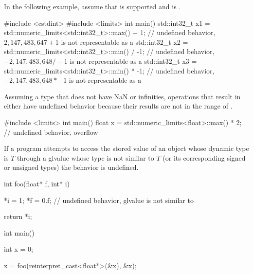 \pnum
\begin{example}
In the following example, assume that
 is supported
and is .
\begin{codeblock}
#include <cstdint>
#include <limits>
int main() {
  std::int32_t x1 = std::numeric_limits<std::int32_t>::max() + 1;
        // undefined behavior, $2{,}147{,}483{,}647 + 1$ is not representable as a 
  std::int32_t x2 = std::numeric_limits<std::int32_t>::min() / -1;
        // undefined behavior, $-2{,}147{,}483{,}648 / -1$ is not representable as a 
  std::int32_t x3 = std::numeric_limits<std::int32_t>::min() * -1;
        // undefined behavior, $-2{,}147{,}483{,}648 * -1$ is not representable as a 
}
\end{codeblock}
\end{example}

\pnum
\begin{example}
Assuming a  type
that does not have
NaN or infinities,
operations that result in either
have undefined behavior
because their results
are not in the range of .
\begin{codeblock}
#include <limits>
int main() {
  float x = std::numeric_limits<float>::max() * 2;  // undefined behavior, overflow
}
\end{codeblock}
\end{example}


\pnum
If a program attempts to access the stored value of an object
whose dynamic type is $T$ through a glvalue
whose type is not similar to $T$
(or its corresponding signed or unsigned types)
the behavior is undefined.

\pnum
\begin{example}
\begin{codeblock}
int foo(float* f, int* i) {
  *i = 1;
  *f = 0.f;     // undefined behavior, glvalue is not similar to 

  return *i;
}

int main() {
  int x = 0;

  x = foo(reinterpret_cast<float*>(&x), &x);
}
\end{codeblock}
\end{example}


